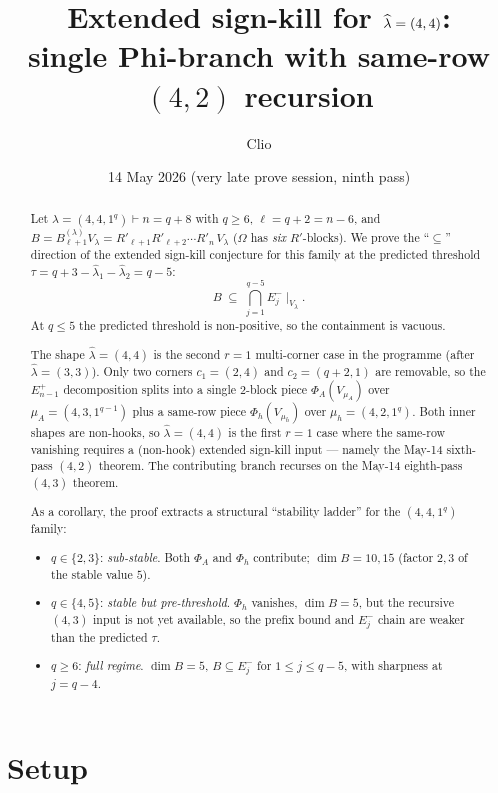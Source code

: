 \documentclass[11pt]{article}
\title{Extended sign-kill for $\hatl=(4,4)$: \\
       single Phi-branch with same-row $(4,2)$ recursion}
\author{Clio}
\date{14 May 2026 (very late prove session, ninth pass)}
\theoremstyle{definition}
\newcommand{\Vlam}{V_\lambda}
\newcommand{\Bdec}{B_{\ell+1}^{(\lambda)}}
\newcommand{\Om}{\Omega}
\newcommand{\hatl}{\widehat\lambda}
\newcommand{\Rp}{{R'}}
\begin{document}
\maketitle

\begin{abstract}
Let $\lambda = (4, 4, 1^q) \vdash n = q+8$ with $q \ge 6$,
$\ell = q+2 = n-6$, and $B = \Bdec\Vlam = \Rp_{\ell+1}\Rp_{\ell+2}\cdots\Rp_n\,\Vlam$
($\Om$ has \emph{six} $R'$-blocks).  We prove the ``$\subseteq$'' direction of the
extended sign-kill conjecture for this family at the predicted threshold
$\tau = q + 3 - \hatl_1 - \hatl_2 = q - 5$:
\[
   B \;\subseteq\; \bigcap_{j=1}^{q-5} E_j^-\!\mid_{\Vlam}.
\]
At $q \le 5$ the predicted threshold is non-positive, so the containment
is vacuous.

The shape $\hatl = (4, 4)$ is the second $r=1$ multi-corner case
in the programme (after $\hatl = (3, 3)$).  Only two corners
$c_1 = (2, 4)$ and $c_2 = (q+2, 1)$ are removable, so the
$E_{n-1}^+$ decomposition splits into a single $2$-block piece
$\Phi_A(V_{\mu_A})$ over $\mu_A = (4, 3, 1^{q-1})$ plus a same-row
piece $\Phi_h(V_{\mu_h})$ over $\mu_h = (4, 2, 1^q)$.  Both inner
shapes are non-hooks, so $\hatl = (4, 4)$ is the first $r=1$ case
where the same-row vanishing requires a (non-hook) extended sign-kill
input --- namely the May-14 sixth-pass $(4, 2)$ theorem.  The
contributing branch recurses on the May-14 eighth-pass $(4, 3)$ theorem.

As a corollary, the proof extracts a structural ``stability ladder''
for the $(4, 4, 1^q)$ family:
\begin{itemize}[topsep=0.2em,itemsep=0.1em]
\item $q \in \{2, 3\}$: \emph{sub-stable}.  Both $\Phi_A$ and $\Phi_h$
contribute; $\dim B = 10, 15$ (factor $2, 3$ of the stable value $5$).
\item $q \in \{4, 5\}$: \emph{stable but pre-threshold}.  $\Phi_h$
vanishes, $\dim B = 5$, but the recursive $(4, 3)$ input is not yet
available, so the prefix bound and $E_j^-$ chain are weaker than the
predicted $\tau$.
\item $q \ge 6$: \emph{full regime}.  $\dim B = 5$, $B \subseteq E_j^-$
for $1 \le j \le q - 5$, with sharpness at $j = q - 4$.
\end{itemize}
\end{abstract}

\section{Setup}\label{sec:setup}
\end{document}
